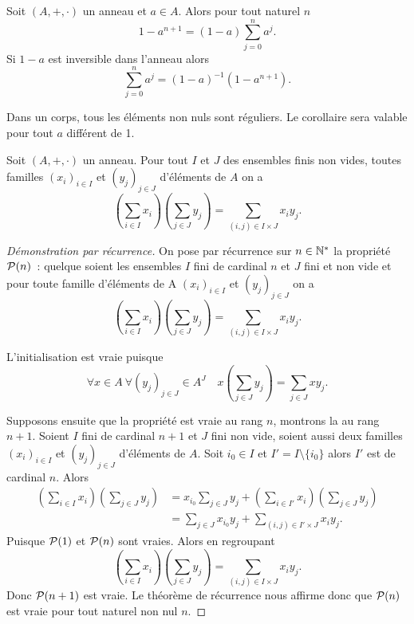 \begin{corth}
  Soit \((A,+,\cdot)\) un anneau et \(a \in A\). Alors pour tout naturel \(n\)
  \begin{equation}
    1-a^{n+1}=(1-a)\sum_{j=0}^n a^j.
  \end{equation}
  Si \(1-a\) est inversible dans l'anneau alors
  \begin{equation}
    \sum_{j=0}^n a^j = (1-a)^{-1}(1-a^{n+1}).
  \end{equation}
\end{corth}
Dans un corps, tous les éléments non nuls sont réguliers. Le corollaire sera
valable pour tout \(a\) différent de 1.

\begin{theo}
  Soit \((A,+,\cdot)\) un anneau. Pour tout \(I\) et \(J\) des ensembles finis
  non vides, toutes familles \((x_i)_{i \in I}\) et \((y_j)_{j \in J}\)
  d'éléments de \(A\) on a
  \begin{equation}
    \left(\sum_{i \in I} x_i \right)\left(\sum_{j \in J} y_j \right) =
    \sum_{(i,j)\in I\times J} x_iy_j.
  \end{equation}
\end{theo}
\begin{proof}[Démonstration par récurrence]
  On pose par récurrence sur \(n \in \N^*\) la propriété \(\P(n)\)~: quelque
  soient les ensembles \(I\) fini de cardinal \(n\) et \(J\) fini et non vide et
  pour toute famille d'éléments de A \((x_i)_{i \in I}\) et \((y_j)_{j \in J}\)
  on a
  \begin{equation} \left(\sum_{i \in I} x_i \right)\left(\sum_{j \in J} y_j
    \right) = \sum_{(i,j)\in I\times J} x_iy_j.
  \end{equation}

  L'initialisation est vraie puisque
  \begin{equation}
    \forall x \in A \ \forall (y_j)_{j \in J} \in A^J \quad x \left(\sum_{j \in
    J} y_j \right) = \sum_{j \in J} xy_j.
  \end{equation}

  Supposons ensuite que la propriété est vraie au rang \(n\), montrons la au
  rang \(n+1\). Soient \(I\) fini de cardinal \(n+1\) et \(J\) fini non vide,
  soient aussi deux familles \((x_i)_{i \in I}\) et \((y_j)_{j \in J}\)
  d'éléments de \(A\). Soit \(i_0 \in I\) et \(I'=I\setminus\{i_0\}\) alors
  \(I'\) est de cardinal \(n\). Alors
  \begin{align}
    \left(\sum_{i \in I} x_i \right)\left(\sum_{j \in J} y_j \right) &=x_{i_0}
    \sum_{j \in J} y_j + \left(\sum_{i \in I'} x_i \right)\left(\sum_{j \in J}
    y_j \right) \\
    &=\sum_{j \in J} x_{i_0}y_j +  \sum_{(i,j)\in I'\times J} x_iy_j.
  \end{align}
  Puisque \(\P(1)\) et \(\P(n)\) sont vraies. Alors en regroupant
  \begin{equation}
    \left(\sum_{i \in I} x_i \right)\left(\sum_{j \in J} y_j \right) =
    \sum_{(i,j)\in I\times J} x_iy_j.
  \end{equation}
  Donc \(\P(n+1)\) est vraie. Le théorème de récurrence nous affirme donc que
  \(\P(n)\) est vraie pour tout naturel non nul \(n\).
\end{proof}
